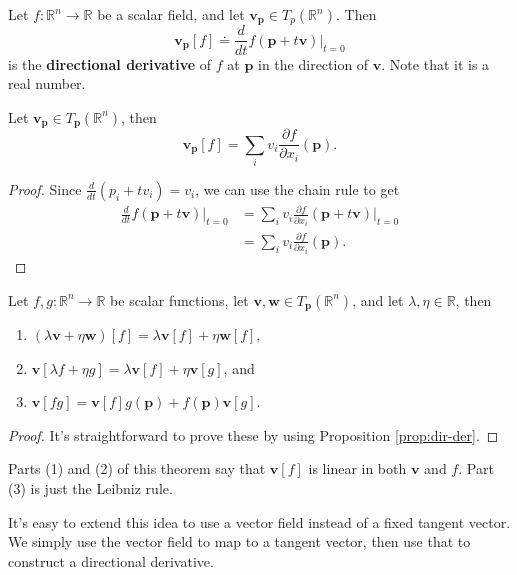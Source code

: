 \documentclass[10pt]{report}
\begin{document}
\begin{defn}
	Let $f:\mathbb{R}^n \to \mathbb{R}$ be a scalar field, and let $\mathbf{v}_{\mathbf{p}} \in T_p(\mathbb{R}^n)$. Then
	\[
		\mathbf{v}_{\mathbf{p}}[f] \doteq \frac{d }{d t} f(\mathbf{p}+t\mathbf{v}) \Big|_{t=0}
\] is the \textbf{directional derivative} of $f$ at $\mathbf{p}$ in the direction of $\mathbf{v}$. Note that it is a real number.
\end{defn}

\begin{prop}
	\label{prop:dir-der}
	Let $\mathbf{v}_\mathbf{p} \in T_\mathbf{p}(\mathbb{R}^n)$, then
	\[
		\mathbf{v}_{\mathbf{p}}[f] = \sum_i v_i \frac{\partial f}{\partial x_i} (\mathbf{p}).
	\] 
\end{prop}
\begin{proof}
	Since $\frac{d }{d t} (p_i + tv_i) = v_i$, we can use the chain rule to get
	\begin{align*}
		\frac{d }{d t} f(\mathbf{p}+t\mathbf{v}) \Big|_{t=0} &= \sum_{i} v_i \frac{\partial f}{\partial x_i} (\mathbf{p}+t\mathbf{v}) \Big|_{t=0} \\
						   &= \sum_i v_i \frac{\partial f}{\partial x_i} (\mathbf{p}).
	\end{align*}
\end{proof}

\begin{thrm}
	\label{thrm:props-of-dir-der}
	Let $f,g:\mathbb{R}^n \to \mathbb{R}$ be scalar functions, let $\mathbf{v},\mathbf{w} \in T_\mathbf{p}(\mathbb{R}^n)$, and let $\lambda,\eta\in\mathbb{R}$, then
	\begin{enumerate}
		\item $(\lambda \mathbf{v} + \eta \mathbf{w})[f] = \lambda \mathbf{v}[f] + \eta \mathbf{w}[f]$,
		\item $\mathbf{v}[\lambda f + \eta g] = \lambda \mathbf{v}[f] + \eta \mathbf{v}[g]$, and
		\item $\mathbf{v}[fg] = \mathbf{v}[f] g(\mathbf{p}) + f(\mathbf{p}) \mathbf{v}[g]$.
	\end{enumerate}
\end{thrm}
\begin{proof}
	It's straightforward to prove these by using Proposition \ref{prop:dir-der}.
\end{proof}

Parts (1) and (2) of this theorem say that $\mathbf{v}[f]$ is linear in both $\mathbf{v}$ and $f$. Part (3) is just the Leibniz rule.

It's easy to extend this idea to use a vector field instead of a fixed tangent vector. We simply use the vector field to map to a tangent vector, then use that to construct a directional derivative.
\end{document}
